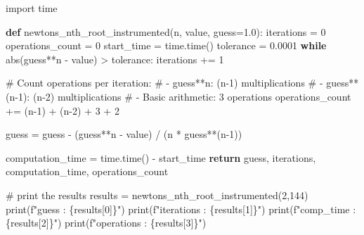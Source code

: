 \documentclass[
  letterpaper,
  DIV=11,
  numbers=noendperiod]{scrartcl}
\newenvironment{Shaded}{\begin{snugshade}}{\end{snugshade}}
\newcommand{\BuiltInTok}[1]{\textcolor[rgb]{0.00,0.23,0.31}{#1}}
\newcommand{\CommentTok}[1]{\textcolor[rgb]{0.37,0.37,0.37}{#1}}
\newcommand{\ControlFlowTok}[1]{\textcolor[rgb]{0.00,0.23,0.31}{\textbf{#1}}}
\newcommand{\DecValTok}[1]{\textcolor[rgb]{0.68,0.00,0.00}{#1}}
\newcommand{\FloatTok}[1]{\textcolor[rgb]{0.68,0.00,0.00}{#1}}
\newcommand{\ImportTok}[1]{\textcolor[rgb]{0.00,0.46,0.62}{#1}}
\newcommand{\KeywordTok}[1]{\textcolor[rgb]{0.00,0.23,0.31}{\textbf{#1}}}
\newcommand{\NormalTok}[1]{\textcolor[rgb]{0.00,0.23,0.31}{#1}}
\newcommand{\OperatorTok}[1]{\textcolor[rgb]{0.37,0.37,0.37}{#1}}
\newcommand{\SpecialCharTok}[1]{\textcolor[rgb]{0.37,0.37,0.37}{#1}}
\newcommand{\SpecialStringTok}[1]{\textcolor[rgb]{0.13,0.47,0.30}{#1}}
\begin{document}
\begin{Shaded}
\begin{Highlighting}[]
\ImportTok{import}\NormalTok{ time}

\KeywordTok{def}\NormalTok{ newtons\_nth\_root\_instrumented(n, value, guess}\OperatorTok{=}\FloatTok{1.0}\NormalTok{):}
\NormalTok{    iterations }\OperatorTok{=} \DecValTok{0}
\NormalTok{    operations\_count }\OperatorTok{=} \DecValTok{0}
\NormalTok{    start\_time }\OperatorTok{=}\NormalTok{ time.time()}
\NormalTok{    tolerance }\OperatorTok{=} \FloatTok{0.0001}
    \ControlFlowTok{while} \BuiltInTok{abs}\NormalTok{(guess}\OperatorTok{**}\NormalTok{n }\OperatorTok{{-}}\NormalTok{ value) }\OperatorTok{\textgreater{}}\NormalTok{ tolerance:}
\NormalTok{        iterations }\OperatorTok{+=} \DecValTok{1}
        
        \CommentTok{\# Count operations per iteration:}
        \CommentTok{\# {-} guess**n: (n{-}1) multiplications}
        \CommentTok{\# {-} guess**(n{-}1): (n{-}2) multiplications}
        \CommentTok{\# {-} Basic arithmetic: 3 operations}
\NormalTok{        operations\_count }\OperatorTok{+=}\NormalTok{ (n}\OperatorTok{{-}}\DecValTok{1}\NormalTok{) }\OperatorTok{+}\NormalTok{ (n}\OperatorTok{{-}}\DecValTok{2}\NormalTok{) }\OperatorTok{+} \DecValTok{3} \OperatorTok{+} \DecValTok{2}
        
\NormalTok{        guess }\OperatorTok{=}\NormalTok{ guess }\OperatorTok{{-}}\NormalTok{ (guess}\OperatorTok{**}\NormalTok{n }\OperatorTok{{-}}\NormalTok{ value) }\OperatorTok{/}\NormalTok{ (n }\OperatorTok{*}\NormalTok{ guess}\OperatorTok{**}\NormalTok{(n}\OperatorTok{{-}}\DecValTok{1}\NormalTok{))}
    
\NormalTok{    computation\_time }\OperatorTok{=}\NormalTok{ time.time() }\OperatorTok{{-}}\NormalTok{ start\_time}
    \ControlFlowTok{return}\NormalTok{ guess, iterations, computation\_time, operations\_count}

\CommentTok{\# print the results}
\NormalTok{results }\OperatorTok{=}\NormalTok{ newtons\_nth\_root\_instrumented(}\DecValTok{2}\NormalTok{,}\DecValTok{144}\NormalTok{)}
\BuiltInTok{print}\NormalTok{(}\SpecialStringTok{f"guess : }\SpecialCharTok{\{}\NormalTok{results[}\DecValTok{0}\NormalTok{]}\SpecialCharTok{\}}\SpecialStringTok{"}\NormalTok{)}
\BuiltInTok{print}\NormalTok{(}\SpecialStringTok{f"iterations : }\SpecialCharTok{\{}\NormalTok{results[}\DecValTok{1}\NormalTok{]}\SpecialCharTok{\}}\SpecialStringTok{"}\NormalTok{)}
\BuiltInTok{print}\NormalTok{(}\SpecialStringTok{f"comp\_time : }\SpecialCharTok{\{}\NormalTok{results[}\DecValTok{2}\NormalTok{]}\SpecialCharTok{\}}\SpecialStringTok{"}\NormalTok{)}
\BuiltInTok{print}\NormalTok{(}\SpecialStringTok{f"operations : }\SpecialCharTok{\{}\NormalTok{results[}\DecValTok{3}\NormalTok{]}\SpecialCharTok{\}}\SpecialStringTok{"}\NormalTok{)}
\end{Highlighting}
\end{Shaded}
\end{document}
